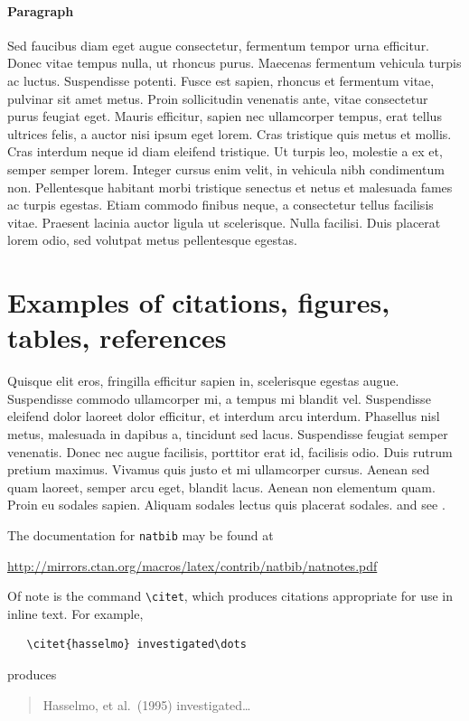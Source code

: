 \documentclass{article}
\begin{document}
\paragraph{Paragraph}
Sed faucibus diam eget augue consectetur, fermentum tempor urna efficitur. Donec vitae tempus nulla, ut rhoncus purus. Maecenas fermentum vehicula turpis ac luctus. Suspendisse potenti. Fusce est sapien, rhoncus et fermentum vitae, pulvinar sit amet metus. Proin sollicitudin venenatis ante, vitae consectetur purus feugiat eget. Mauris efficitur, sapien nec ullamcorper tempus, erat tellus ultrices felis, a auctor nisi ipsum eget lorem. Cras tristique quis metus et mollis. Cras interdum neque id diam eleifend tristique. Ut turpis leo, molestie a ex et, semper semper lorem. Integer cursus enim velit, in vehicula nibh condimentum non. Pellentesque habitant morbi tristique senectus et netus et malesuada fames ac turpis egestas. Etiam commodo finibus neque, a consectetur tellus facilisis vitae. Praesent lacinia auctor ligula ut scelerisque. Nulla facilisi. Duis placerat lorem odio, sed volutpat metus pellentesque egestas. 


\section{Examples of citations, figures, tables, references}
\label{sec:others}
Quisque elit eros, fringilla efficitur sapien in, scelerisque egestas augue. Suspendisse commodo ullamcorper mi, a tempus mi blandit vel. Suspendisse eleifend dolor laoreet dolor efficitur, et interdum arcu interdum. Phasellus nisl metus, malesuada in dapibus a, tincidunt sed lacus. Suspendisse feugiat semper venenatis. Donec nec augue facilisis, porttitor erat id, facilisis odio. Duis rutrum pretium maximus. Vivamus quis justo et mi ullamcorper cursus. Aenean sed quam laoreet, semper arcu eget, blandit lacus. Aenean non elementum quam. Proin eu sodales sapien. Aliquam sodales lectus quis placerat sodales. \cite{kour2014real,kour2014fast} and see \cite{hadash2018estimate}.

The documentation for \verb+natbib+ may be found at
\begin{center}
  \url{http://mirrors.ctan.org/macros/latex/contrib/natbib/natnotes.pdf}
\end{center}
Of note is the command \verb+\citet+, which produces citations
appropriate for use in inline text.  For example,
\begin{verbatim}
   \citet{hasselmo} investigated\dots
\end{verbatim}
produces
\begin{quote}
  Hasselmo, et al.\ (1995) investigated\dots
\end{quote}
\end{document}
